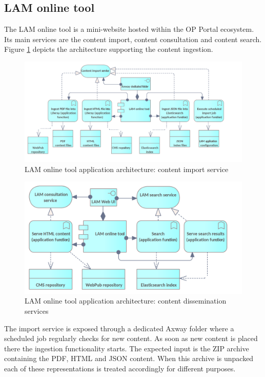	\subsection{LAM online tool}
	
	The LAM online tool is a mini-website hosted within the OP Portal ecosystem. Its main services are the content import, content consultation and content search. Figure \ref{fig:app-online-tool-ingestion} depicts the architecture supporting the content ingestion. 
	
	
    \begin{figure}[!h]
		\centering
		\includegraphics[width=.98\textwidth]{images/application/Online tool - import.png}
		\caption{LAM online tool application architecture: content import service}
		\label{fig:app-online-tool-ingestion}
	\end{figure}	

    \begin{figure}[!h]
	\centering
	\includegraphics[width=.8\textwidth]{images/application/Online tool - dissemination.png}
	\caption{LAM online tool application architecture: content dissemination services}
	\label{fig:app-online-tool-dissemination}
	\end{figure}
	
	The import service is exposed through a dedicated Axway folder where a scheduled job regularly checks for new content. As soon as new content is placed there the ingestion functionality starts. The expected input is the ZIP archive containing the PDF, HTML and JSON content. When this archive is unpacked each of these representations is treated accordingly for different purposes.
	
